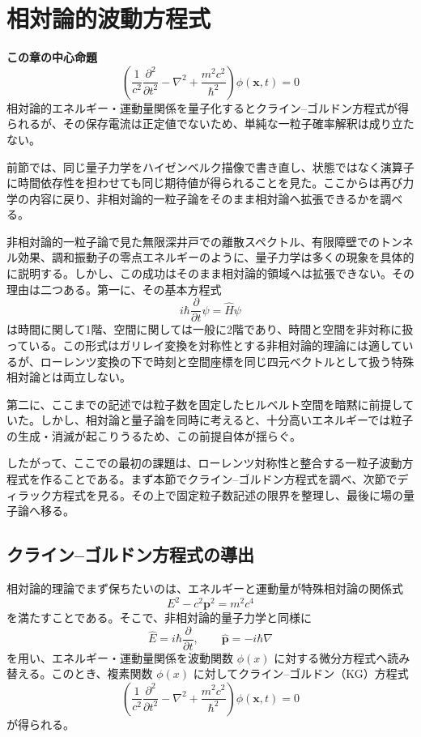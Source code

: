 \section{相対論的波動方程式}

\noindent\textbf{この章の中心命題}
\[
\boxed{
\left(
\frac{1}{c^2}\frac{\partial^2}{\partial t^2}
-\nabla^2+\frac{m^2c^2}{\hbar^2}
\right)\phi(\mathbf{x},t)=0
}
\]
相対論的エネルギー・運動量関係を量子化するとクライン--ゴルドン方程式が得られるが、その保存電流は正定値でないため、単純な一粒子確率解釈は成り立たない。

前節では、同じ量子力学をハイゼンベルク描像で書き直し、状態ではなく演算子に時間依存性を担わせても同じ期待値が得られることを見た。ここからは再び力学の内容に戻り、非相対論的一粒子論をそのまま相対論へ拡張できるかを調べる。

非相対論的一粒子論で見た無限深井戸での離散スペクトル、有限障壁でのトンネル効果、調和振動子の零点エネルギーのように、量子力学は多くの現象を具体的に説明する。しかし、この成功はそのまま相対論的領域へは拡張できない。その理由は二つある。第一に、その基本方程式
\[
i\hbar \frac{\partial}{\partial t}\psi = \hat{H}\psi
\]
は時間に関して1階、空間に関しては一般に2階であり、時間と空間を非対称に扱っている。この形式はガリレイ変換を対称性とする非相対論的理論には適しているが、ローレンツ変換の下で時刻と空間座標を同じ四元ベクトルとして扱う特殊相対論とは両立しない。

第二に、ここまでの記述では粒子数を固定したヒルベルト空間を暗黙に前提していた。しかし、相対論と量子論を同時に考えると、十分高いエネルギーでは粒子の生成・消滅が起こりうるため、この前提自体が揺らぐ。

したがって、ここでの最初の課題は、ローレンツ対称性と整合する一粒子波動方程式を作ることである。まず本節でクライン--ゴルドン方程式を調べ、次節でディラック方程式を見る。その上で固定粒子数記述の限界を整理し、最後に場の量子論へ移る。

\subsection{クライン--ゴルドン方程式の導出}
相対論的理論でまず保ちたいのは、エネルギーと運動量が特殊相対論の関係式
\begin{equation}
    E^2 - c^2 \mathbf{p}^2 = m^2 c^4
\end{equation}
を満たすことである。そこで、非相対論的量子力学と同様に
\[
\hat{E}=i\hbar\frac{\partial}{\partial t},
\qquad
\hat{\mathbf{p}}=-i\hbar\nabla
\]
を用い、エネルギー・運動量関係を波動関数 $\phi(x)$ に対する微分方程式へ読み替える。このとき、複素関数 $\phi(x)$ に対してクライン--ゴルドン（KG）方程式
\begin{equation}
    \left( \frac{1}{c^2} \frac{\partial^2}{\partial t^2} - \nabla^2 + \frac{m^2 c^2}{\hbar^2} \right) \phi(\mathbf{x}, t) = 0
\end{equation}
が得られる。

